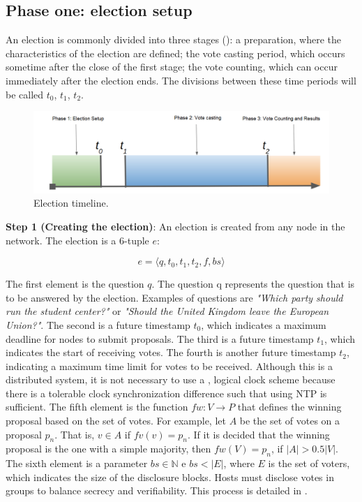 \documentclass[english]{textolivre}
\begin{document}
\subsection{Phase one: election setup \label{sec-phase-one}}


An election is commonly divided into three stages (): a preparation, where the characteristics of the election are defined; the vote casting period, which occurs sometime after the close of the first stage; the vote counting, which can occur immediately after the election ends. The divisions between these time periods will be called $t_{0}$, $t_{1}$, $t_{2}$.

\begin{figure}[htb]
\centering
\begin{minipage}{.8\textwidth}
 \includegraphics[width=\textwidth]{imagens/fig-001.png}
 \caption{Election timeline.}\label{fig_grafico}
\end{minipage}
\end{figure}


\textbf{Step 1 (Creating the election)}: An election is created from any node in the network. The election is a 6-tuple $e$:

\[
 e=\langle q, t_{0}, t_{1}, t_{2}, f, bs \rangle
\]

The first element is the question $q$. The question q represents the question that is to be answered by the election. Examples of questions are \textit{"Which party should run the student center?"} or \textit{"Should the United Kingdom leave the European Union?"}. The second is a future timestamp $t_{0}$, which indicates a maximum deadline for nodes to submit proposals. The third is a future timestamp $t_{1}$, which indicates the start of receiving votes. The fourth is another future timestamp $t_{2}$, indicating a maximum time limit for votes to be received. Although this is a distributed system, it is not necessary to use a , logical clock scheme because there is a tolerable clock synchronization difference such that using NTP is sufficient. The fifth element is the function $fw:V\longrightarrow P$ that defines the winning proposal based on the set of votes. For example, let $A$ be the set of votes on a proposal $p_{n}$. That is, $v \in A$ if $fv(v) = p_{n}$. If it is decided that the winning proposal is the one with a simple majority, then $fw(V) = p_{n}$, if $|A| > 0.5|V|$. The sixth element is a parameter $bs \in \mathbb{N}$ e $bs < |E|$, where $E$ is the set of voters, which indicates the size of the disclosure blocks. Hosts must disclose votes in groups to balance secrecy and verifiability. This process is detailed in .
\end{document}
